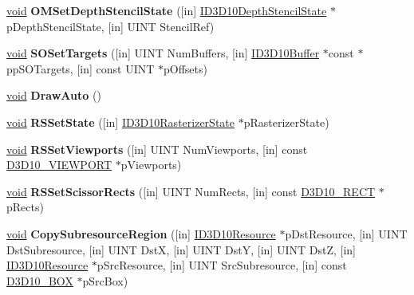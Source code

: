 \begin{DoxyCompactItemize}
\item 
\mbox{\label{interface_i_d3_d10_device_a84545f58bfb9fe21c4af3ed231417085}} 
\hyperlink{interfacevoid}{void} {\bfseries O\+M\+Set\+Depth\+Stencil\+State} (\mbox{[}in\mbox{]} \hyperlink{interface_i_d3_d10_depth_stencil_state}{I\+D3\+D10\+Depth\+Stencil\+State} $\ast$p\+Depth\+Stencil\+State, \mbox{[}in\mbox{]} U\+I\+NT Stencil\+Ref)
\item 
\mbox{\label{interface_i_d3_d10_device_a17228ee72c2502b4843eabd07f4ae9e5}} 
\hyperlink{interfacevoid}{void} {\bfseries S\+O\+Set\+Targets} (\mbox{[}in\mbox{]} U\+I\+NT Num\+Buffers, \mbox{[}in\mbox{]} \hyperlink{interface_i_d3_d10_buffer}{I\+D3\+D10\+Buffer} $\ast$const $\ast$pp\+S\+O\+Targets, \mbox{[}in\mbox{]} const U\+I\+NT $\ast$p\+Offsets)
\item 
\mbox{\label{interface_i_d3_d10_device_a798487aa6a32f05091086437658e3021}} 
\hyperlink{interfacevoid}{void} {\bfseries Draw\+Auto} ()
\item 
\mbox{\label{interface_i_d3_d10_device_a9a298855328420e0e2740eed761be5d0}} 
\hyperlink{interfacevoid}{void} {\bfseries R\+S\+Set\+State} (\mbox{[}in\mbox{]} \hyperlink{interface_i_d3_d10_rasterizer_state}{I\+D3\+D10\+Rasterizer\+State} $\ast$p\+Rasterizer\+State)
\item 
\mbox{\label{interface_i_d3_d10_device_a490e05f55c5feb08f11cb23b7e9be2be}} 
\hyperlink{interfacevoid}{void} {\bfseries R\+S\+Set\+Viewports} (\mbox{[}in\mbox{]} U\+I\+NT Num\+Viewports, \mbox{[}in\mbox{]} const \hyperlink{struct_d3_d10___v_i_e_w_p_o_r_t}{D3\+D10\+\_\+\+V\+I\+E\+W\+P\+O\+RT} $\ast$p\+Viewports)
\item 
\mbox{\label{interface_i_d3_d10_device_a70b9967c4993f79300daee93e2931b3d}} 
\hyperlink{interfacevoid}{void} {\bfseries R\+S\+Set\+Scissor\+Rects} (\mbox{[}in\mbox{]} U\+I\+NT Num\+Rects, \mbox{[}in\mbox{]} const \hyperlink{structtag_r_e_c_t}{D3\+D10\+\_\+\+R\+E\+CT} $\ast$p\+Rects)
\item 
\mbox{\label{interface_i_d3_d10_device_ae28e62c15e52f7913a5ceb26ae64dad0}} 
\hyperlink{interfacevoid}{void} {\bfseries Copy\+Subresource\+Region} (\mbox{[}in\mbox{]} \hyperlink{interface_i_d3_d10_resource}{I\+D3\+D10\+Resource} $\ast$p\+Dst\+Resource, \mbox{[}in\mbox{]} U\+I\+NT Dst\+Subresource, \mbox{[}in\mbox{]} U\+I\+NT DstX, \mbox{[}in\mbox{]} U\+I\+NT DstY, \mbox{[}in\mbox{]} U\+I\+NT DstZ, \mbox{[}in\mbox{]} \hyperlink{interface_i_d3_d10_resource}{I\+D3\+D10\+Resource} $\ast$p\+Src\+Resource, \mbox{[}in\mbox{]} U\+I\+NT Src\+Subresource, \mbox{[}in\mbox{]} const \hyperlink{struct_d3_d10___b_o_x}{D3\+D10\+\_\+\+B\+OX} $\ast$p\+Src\+Box)

\end{DoxyCompactItemize}
